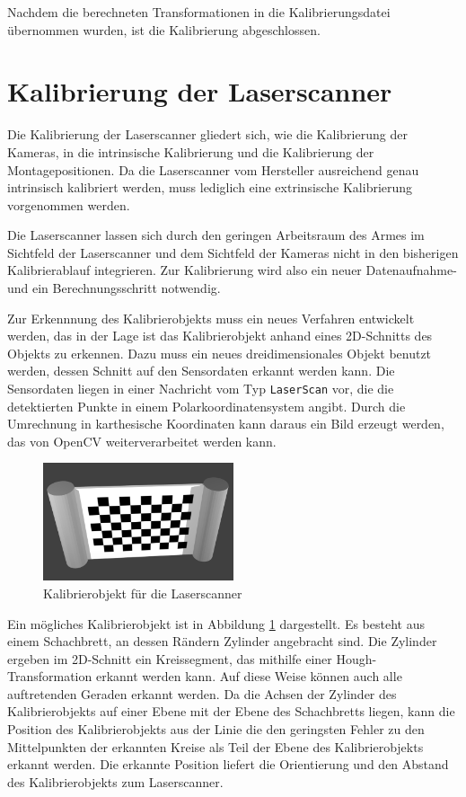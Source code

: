 Nachdem die berechneten Transformationen in die Kalibrierungsdatei übernommen 
wurden, ist die Kalibrierung abgeschlossen.


\section{Kalibrierung der Laserscanner}
\label{sec:Kalibrierung der Laserscanner}

Die Kalibrierung der Laserscanner gliedert sich, wie die Kalibrierung der 
Kameras, in die intrinsische Kalibrierung und die Kalibrierung der Montagepositionen.
Da die Laserscanner vom Hersteller ausreichend genau intrinsisch kalibriert werden,
muss lediglich eine extrinsische Kalibrierung vorgenommen werden. 

Die Laserscanner lassen sich durch den geringen Arbeitsraum des Armes im Sichtfeld 
der Laserscanner und dem Sichtfeld der
Kameras nicht in den bisherigen Kalibrierablauf integrieren. Zur Kalibrierung 
wird also ein neuer Datenaufnahme- und ein Berechnungsschritt notwendig. 

Zur Erkennnung des Kalibrierobjekts muss ein neues Verfahren entwickelt werden,
das in der Lage ist das Kalibrierobjekt anhand eines 2D-Schnitts des Objekts zu erkennen. Dazu muss
ein neues dreidimensionales Objekt benutzt werden, dessen Schnitt auf den 
Sensordaten erkannt werden kann. 
Die Sensordaten liegen in einer Nachricht vom Typ \texttt{LaserScan} vor, die 
die detektierten Punkte in einem Polarkoordinatensystem angibt\cite{laserscan}. Durch die Umrechnung
in karthesische Koordinaten kann daraus ein Bild erzeugt werden, das von OpenCV
weiterverarbeitet werden kann.

\begin{figure}[htpb]
  \centering
  \includegraphics[width=0.5\textwidth]{images/laser_calibration_object}
  \caption{Kalibrierobjekt für die Laserscanner}
  \label{fig:kalibrierobjekt-laser}
\end{figure}

Ein mögliches Kalibrierobjekt ist in Abbildung \ref{fig:kalibrierobjekt-laser} dargestellt.
Es besteht aus einem Schachbrett, an dessen Rändern Zylinder angebracht sind.
Die Zylinder ergeben im 2D-Schnitt ein Kreissegment, das mithilfe einer 
Hough-Transformation \cite{rohtua} erkannt werden kann. Auf diese Weise können 
auch alle 
auftretenden Geraden erkannt werden. 
Da die Achsen der 
Zylinder des Kalibrierobjekts auf einer Ebene mit der Ebene des Schachbretts liegen, kann die
Position des Kalibrierobjekts aus der Linie die den geringsten Fehler zu den
Mittelpunkten der erkannten Kreise als Teil der Ebene des Kalibrierobjekts
erkannt werden. Die erkannte Position liefert die Orientierung und den Abstand
des Kalibrierobjekts zum Laserscanner. 

